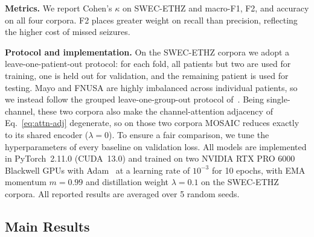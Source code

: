 \documentclass[letterpaper]{article}
\begin{document}
\noindent\textbf{Metrics.} 
We report
Cohen's $\kappa$ \cite{carzaniga2026foundation} on SWEC-ETHZ and macro-F1, F2, and accuracy on all four corpora. F2 places greater weight on recall than precision, reflecting the higher cost of missed seizures.

\noindent\textbf{Protocol and implementation.} On the SWEC-ETHZ corpora
we adopt a leave-one-patient-out protocol: for each fold, all patients
but two are used for training, one is held out for validation, and the
remaining patient is used for testing. Mayo and FNUSA are highly imbalanced
across individual patients, so we instead  follow the grouped leave-one-group-out protocol of~\cite{wang2022seegnet}. Being single-channel, these two corpora also make the channel-attention adjacency
of Eq.~\eqref{eq:attn-adj} degenerate, so on those two corpora MOSAIC
reduces exactly to its shared encoder ($\lambda = 0$). To ensure a fair
comparison, we tune
the hyperparameters of every baseline on validation loss. All models are
implemented in PyTorch~2.11.0 (CUDA~13.0) and trained on two NVIDIA RTX
PRO 6000 Blackwell GPUs with Adam~\cite{kingma2015adam} at a learning
rate of $10^{-3}$ for 10 epochs, with EMA momentum $m = 0.99$ and
distillation weight $\lambda = 0.1$ on the SWEC-ETHZ corpora. All
reported results are averaged over 5 random seeds.

\subsection{Main Results}
\label{ssec:results}
\end{document}
